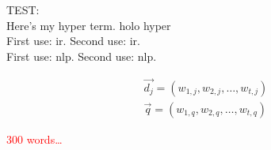 TEST:\\
Here’s my \ac{hyper} term. \ac{holo} \ac{hyper}\\
First use: \ac{ir}. Second use: \ac{ir}.\\
First use: \ac{nlp}. Second use: \ac{nlp}.

\begin{align}
\vec{d_j} = \left(w_{1,j}, w_{2,j}, \ldots, w_{t,j} \right) \\
\vec{q} = \left(w_{1,q}, w_{2,q}, \ldots, w_{t,q} \right)
\end{align}

\textcolor{red}{300 words\ldots}

\begin{comment}
\end{comment}

\begin{draft}
\end{draft}

\begin{shaded}
\end{shaded}


